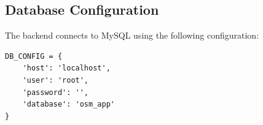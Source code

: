 \subsection{Database Configuration}

The backend connects to MySQL using the following configuration:

\begin{tcolorbox}[colback=gray!10,colframe=black!50,arc=2mm,title=Backend Database Configuration (Python)]
\begin{verbatim}
DB_CONFIG = {
    'host': 'localhost',
    'user': 'root',
    'password': '',
    'database': 'osm_app'
}
\end{verbatim}
\end{tcolorbox}



